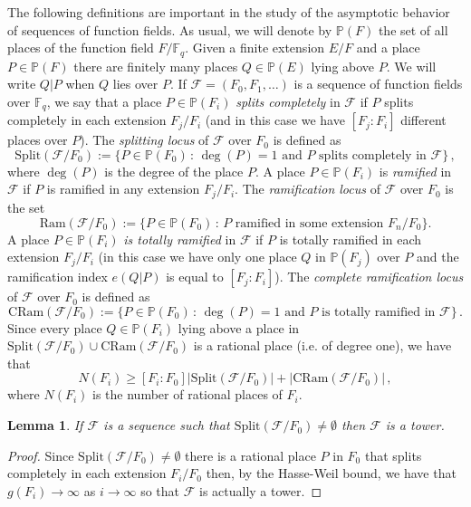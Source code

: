 \documentclass{amsart}
\newcommand{\m}{\mathcal}
\newcommand{\F}{\mathbb{F}}
\renewcommand{\P}{\mathbb{P}}
\newtheorem{lem}[thm]{Lemma}
\theoremstyle{definition}
\begin{document}
 The following definitions are important in the study of the asymptotic behavior of sequences of function fields.  As usual, we will denote by $\P(F)$ the set of all places of the function field $F/\F_q$. 
  Given a finite extension $E/F$ and a place $P\in \P(F)$ there are finitely many places $Q\in \P(E)$ lying above $P$. We will write $Q|P$ when $Q$ lies over $P$. If $\m{F}=(F_0, F_1, \ldots)$ is a sequence of function fields over $\F_q$, we say that a place $P\in \mathbb{P}(F_i)$ {\em splits completely} in $\mathcal{F}$ if $P$ splits completely in each extension $F_j/F_i$ (and in this case we have $[F_j:F_i]$ different places over $P$). The {\em splitting locus} of $\mathcal{F}$ over $F_0$ is defined as
\[\mathrm{Split}(\mathcal{F}/F_0):=\{P\in \mathbb{P}(F_0)\,:\,\text{$\deg(P)=1$ and $P$ splits completely in $\mathcal{F}$}\}\,,\] where $\deg(P)$ is the degree of the place $P$.
A place $P\in \mathbb{P}(F_i)$ is {\em ramified} in $\mathcal{F}$ if $P$ is ramified in any extension $F_j/F_i$.
The {\em ramification locus} of $\m{F}$ over $F_0$ is the set
$$\mathrm{Ram}(\m{F}/F_0):=\{P\in \mathbb{P}(F_0)\,:\,\text{$P$ ramified in some extension }F_n/F_0\}.$$ A place $P\in \mathbb{P}(F_i)$ {\em is totally ramified} in $\mathcal{F}$ if $P$ is totally ramified in each extension $F_j/F_i$ (in this case we have only one place $Q$ in $\P(F_j)$ over $P$ and the ramification index $e(Q|P)$ is equal to $[F_j:F_i]$).  The {\em complete ramification locus} of $\mathcal{F}$ over $F_0$ is defined as
\[\mathrm{CRam}(\mathcal{F}/F_0) :=\{P\in \mathbb{P}(F_0)\,:\,\text{$\deg(P)=1$ and $P$ is totally ramified in $\mathcal{F}$}\}\,.\]
Since every place $Q\in \mathbb{P}(F_i)$ lying above a place in $\mathrm{Split}(\mathcal{F}/F_0)\cup \mathrm{CRam}(\mathcal{F}/F_0)$ is a rational place (i.e. of degree one), we have that
\begin{equation}\label{splitcram}
N(F_i)\geq [F_i:F_0]|\mathrm{Split}(\mathcal{F}/F_0)|+|\mathrm{CRam}(\mathcal{F}/F_0)|\,,
\end{equation} where $N(F_i)$ is the number of rational places of $F_i$.

\begin{lem}
If $\mathcal{F}$ is a sequence such that $\mathrm{Split}(\mathcal{F}/F_0)\neq \emptyset$ then $\mathcal{F}$ is a tower.
\end{lem}
\begin{proof}
Since  $\mathrm{Split}(\mathcal{F}/F_0)\neq \emptyset$  there is a rational place  $P$ in $F_0$ that splits completely in each extension $F_i/F_0$ then, by the Hasse-Weil bound, we have that $g(F_i)\rightarrow\infty$ as  $i\rightarrow\infty$  so that $\mathcal{F}$ is actually a tower. 
\end{proof}
\end{document}
